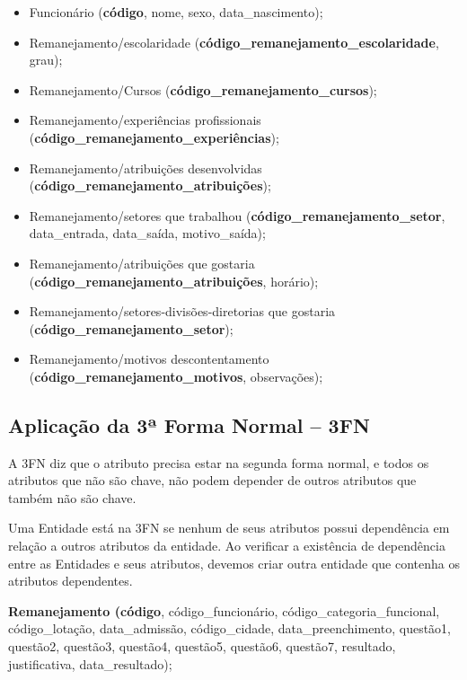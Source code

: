 \documentclass{article}
\begin{document}
\begin{itemize}[label=--]
    \item Funcionário (\textbf{código}, nome, sexo, data\_nascimento);
    \item Remanejamento/escolaridade (\textbf{código\_remanejamento\_escolaridade}, grau);
    \item Remanejamento/Cursos (\textbf{código\_remanejamento\_cursos});
    \item Remanejamento/experiências profissionais (\textbf{código\_remanejamento\_experiências});
    \item Remanejamento/atribuições desenvolvidas (\textbf{código\_remanejamento\_atribuições});
    \item Remanejamento/setores que trabalhou (\textbf{código\_remanejamento\_setor}, data\_entrada, data\_saída, motivo\_saída);
    \item Remanejamento/atribuições que gostaria (\textbf{código\_remanejamento\_atribuições}, horário);
    \item Remanejamento/setores-divisões-diretorias que gostaria (\textbf{código\_remanejamento\_setor});
    \item Remanejamento/motivos descontentamento (\textbf{código\_remanejamento\_motivos}, observações);
\end{itemize}

\subsection*{Aplicação da 3ª Forma Normal – 3FN}
A 3FN diz que o atributo precisa estar na segunda forma normal, e todos os atributos que não são chave, não podem depender de outros atributos que também não são chave.

Uma Entidade está na 3FN se nenhum de seus atributos possui dependência em relação a outros atributos da entidade. Ao verificar a existência de dependência entre as Entidades e seus atributos, devemos criar outra entidade que contenha os atributos dependentes.

\textbf{Remanejamento (código}, código\_funcionário, código\_categoria\_funcional, código\_lotação, data\_admissão, código\_cidade, data\_preenchimento, questão1, questão2, questão3, questão4, questão5, questão6, questão7, resultado, justificativa, data\_resultado);
\end{document}

